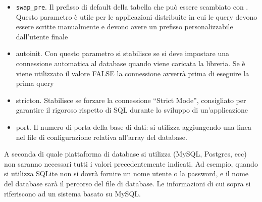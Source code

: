 \begin{itemize}
\item \verb|swap_pre|. Il prefisso di default della tabella che può essere scambiato con . Questo parametro è utile per le applicazioni distribuite in cui le query devono essere scritte manualmente e devono avere un prefisso personalizzabile dall'utente finale
\item autoinit. Con questo parametro si stabilisce se si deve impostare una connessione automatica al database quando viene caricata la libreria. Se è viene utilizzato il valore FALSE la connessione avverrà prima di eseguire la prima query
\item stricton. Stabilisce se forzare la connessione ``Strict Mode'', consigliato per garantire il rigoroso rispetto di SQL durante lo sviluppo di un'applicazione
\item port. Il numero di porta della base di dati: si utilizza aggiungendo una linea nel file di configurazione relativa all'array del database.

\end{itemize}

A seconda di quale piattaforma di database si utilizza (MySQL, Postgres, ecc) non saranno necessari tutti i valori precedentemente indicati. Ad esempio, quando si utilizza SQLite non si dovrà fornire un nome utente o la password, e il nome del database sarà il percorso del file di database. Le informazioni di cui sopra si riferiscono ad un sistema basato su MySQL.
